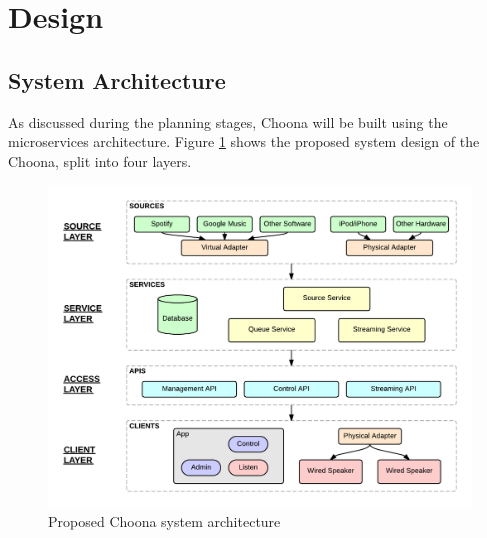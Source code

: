 \section{Design}

\subsection{System Architecture}

As discussed during the planning stages, Choona will be built using the microservices architecture. Figure \ref{fig:architecture} shows the proposed system design of the Choona, split into four layers.

\begin{figure}[h!]
  \centering
  \includegraphics[width=1\textwidth]{./img/sys-architecture.png}
  \caption{Proposed Choona system architecture}
  \label{fig:architecture}
\end{figure}

